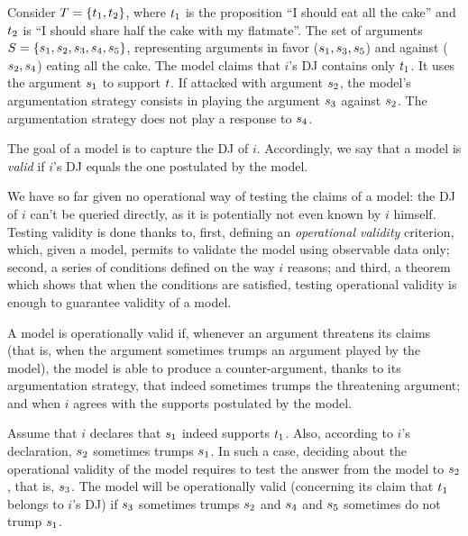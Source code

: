 \documentclass[version=3.21, pagesize, twoside=off, bibliography=totoc, DIV=calc, fontsize=12pt, a4paper, french, english]{scrartcl}
\begin{document}
\begin{example}
	Consider $T=\{t_1, t_2\}$, where $t_1$ is the proposition “I should eat all the cake” and $t_2$ is “I should share half the cake with my flatmate”. The set of arguments $S = \{s_1, s_2, s_3, s_4, s_5\}$, representing arguments in favor ($s_1, s_3, s_5$) and against ($s_2, s_4$) eating all the cake. The model claims that $i$’s \ac{DJ} contains only $t_1$. It uses the argument $s_1$ to support $t$. If attacked with argument $s_2$, the model’s argumentation strategy consists in playing the argument $s_3$ against $s_2$. The argumentation strategy does not play a response to $s_4$.
\end{example}

The goal of a model is to capture the \ac{DJ} of $i$. Accordingly, we say that a model is \emph{valid} if $i$’s \ac{DJ} equals the one postulated by the model.

We have so far given no operational way of testing the claims of a model: the \ac{DJ} of $i$ can’t be queried directly, as it is potentially not even known by $i$ himself. Testing validity is done thanks to, first, defining an \emph{operational validity} criterion, which, given a model, permits to validate the model using observable data only; second, a series of conditions defined on the way $i$ reasons; and third, a theorem which shows that when the conditions are satisfied, testing operational validity is enough to guarantee validity of a model.

A model is operationally valid if, whenever an argument threatens its claims (that is, when the argument sometimes trumps an argument played by the model), the model is able to produce a counter-argument, thanks to its argumentation strategy, that indeed sometimes trumps the threatening argument; and when $i$ agrees with the supports postulated by the model.

\begin{example}[cont.]
	Assume that $i$ declares that $s_1$ indeed supports $t_1$. Also, according to $i$’s declaration, $s_2$ sometimes trumps $s_1$. In such a case, deciding about the operational validity of the model requires to test the answer from the model to $s_2$, that is, $s_3$. The model will be operationally valid (concerning its claim that $t_1$ belongs to $i$’s \ac{DJ}) if $s_3$ sometimes trumps $s_2$ and $s_4$ and $s_5$ sometimes do not trump $s_1$.
\end{example}
\end{document}
